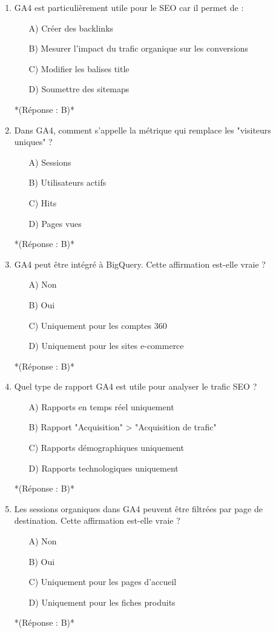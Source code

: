 \documentclass[12pt,a4paper,twoside]{report}
\begin{document}
\begin{enumerate}
    \item GA4 est particulièrement utile pour le SEO car il permet de :
    \begin{itemize}
        \item[A)] Créer des backlinks
        \item[B)] Mesurer l'impact du trafic organique sur les conversions
        \item[C)] Modifier les balises title
        \item[D)] Soumettre des sitemaps
    \end{itemize}
    *(Réponse : B)*

    \item Dans GA4, comment s'appelle la métrique qui remplace les "visiteurs uniques" ?
    \begin{itemize}
        \item[A)] Sessions
        \item[B)] Utilisateurs actifs
        \item[C)] Hits
        \item[D)] Pages vues
    \end{itemize}
    *(Réponse : B)*

    \item GA4 peut être intégré à BigQuery. Cette affirmation est-elle vraie ?
    \begin{itemize}
        \item[A)] Non
        \item[B)] Oui
        \item[C)] Uniquement pour les comptes 360
        \item[D)] Uniquement pour les sites e-commerce
    \end{itemize}
    *(Réponse : B)*

    \item Quel type de rapport GA4 est utile pour analyser le trafic SEO ?
    \begin{itemize}
        \item[A)] Rapports en temps réel uniquement
        \item[B)] Rapport "Acquisition" > "Acquisition de trafic"
        \item[C)] Rapports démographiques uniquement
        \item[D)] Rapports technologiques uniquement
    \end{itemize}
    *(Réponse : B)*

    \item Les sessions organiques dans GA4 peuvent être filtrées par page de destination. Cette affirmation est-elle vraie ?
    \begin{itemize}
        \item[A)] Non
        \item[B)] Oui
        \item[C)] Uniquement pour les pages d'accueil
        \item[D)] Uniquement pour les fiches produits
    \end{itemize}
    *(Réponse : B)*


\end{enumerate}
\end{document}
